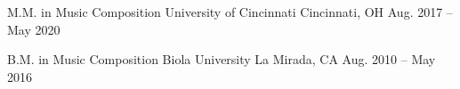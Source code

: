 
\begin{cventries}

	\cventry
	{M.M. in Music Composition} %
	{University of Cincinnati} %
	{Cincinnati, OH} %
	{Aug. 2017 -- May 2020} %
	{}

	\cventry
	{B.M. in Music Composition} %
	{Biola University} %
	{La Mirada, CA} %
	{Aug. 2010 -- May 2016} %
	{}


\end{cventries}
